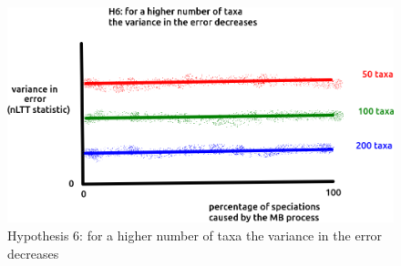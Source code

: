 \begin{figure}[!htbp]
  \includegraphics[width=\textwidth]{razzo-figures/fig_h_6.png}
  \caption{
    Hypothesis 6: for a higher number of taxa 
    the variance in the error decreases
  }
  \label{fig:h_6}
\end{figure}